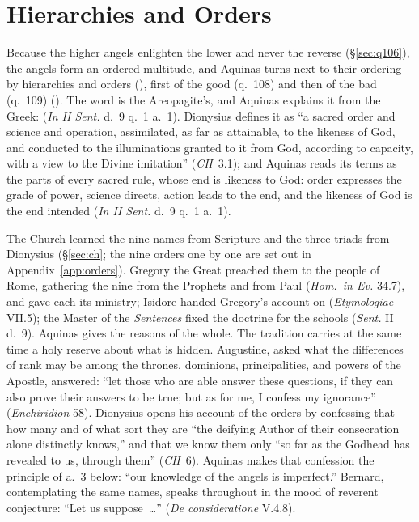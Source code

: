 \section{Hierarchies and Orders}\label{sec:hierarchies}

Because the higher angels enlighten the lower and never the reverse
(\S\ref{sec:q106}), the angels form an ordered multitude, and Aquinas
turns next to their ordering by hierarchies and orders (), first of the good (q.~108) and then of the bad (q.~109)
(). The word  is the Areopagite's, and
Aquinas explains it from the Greek: 
(\emph{In II Sent.} d.~9 q.~1 a.~1). Dionysius defines it as ``a sacred
order and science and operation, assimilated, as far as attainable, to the
likeness of God, and conducted to the illuminations granted to it from God,
according to capacity, with a view to the Divine imitation'' (\emph{CH}~3.1); and Aquinas reads its terms as the parts of every sacred rule,
whose end is likeness to God: order expresses the grade of power, science directs, action leads to
the end, and the likeness of God is the end intended (\emph{In II Sent.}
d.~9 q.~1 a.~1).

The Church learned the nine names from Scripture and the three triads from
Dionysius (\S\ref{sec:ch}; the nine orders one by one are set out in
Appendix~\ref{app:orders}). Gregory the Great preached them to the people
of Rome, gathering the nine from the Prophets and from Paul (\emph{Hom.\ in
Ev.} 34.7), and gave each its ministry; Isidore handed Gregory's
account on (\emph{Etymologiae} VII.5); the Master of the \emph{Sentences}
fixed the doctrine for the schools (\emph{Sent.} II d.~9). Aquinas gives
the reasons of the whole. The tradition carries at the same time a holy
reserve about what is hidden. Augustine, asked what the differences of rank
may be among the thrones, dominions, principalities, and powers of the
Apostle, answered: ``let those who are able answer these questions, if they
can also prove their answers to be true; but as for me, I confess my
ignorance'' (\emph{Enchiridion} 58). Dionysius opens his account of the
orders by confessing that how many and of what sort they are ``the deifying
Author of their consecration alone distinctly knows,'' and that we know them
only ``so far as the Godhead has revealed to us, through them'' (\emph{CH}~6). Aquinas makes that confession the principle of a.~3 below: ``our
knowledge of the angels is imperfect.'' Bernard, contemplating the same
names, speaks throughout in the mood of reverent conjecture: ``Let us
suppose~\dots'' (\emph{De consideratione} V.4.8).

